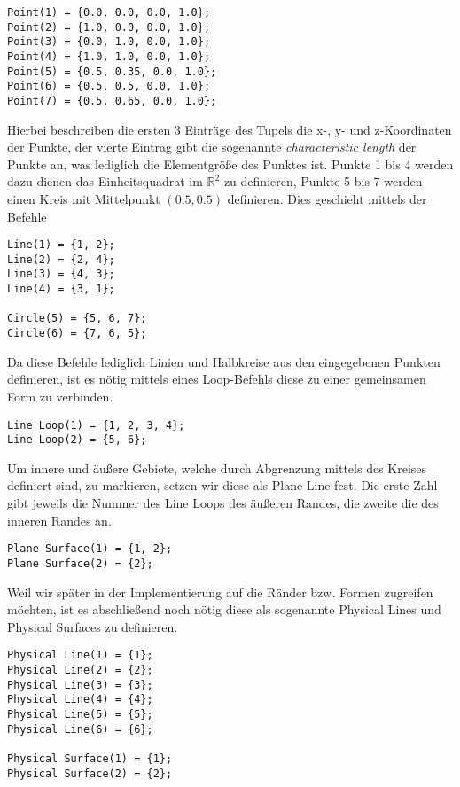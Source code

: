 \begin{lstlisting}
Point(1) = {0.0, 0.0, 0.0, 1.0};
Point(2) = {1.0, 0.0, 0.0, 1.0};
Point(3) = {0.0, 1.0, 0.0, 1.0};
Point(4) = {1.0, 1.0, 0.0, 1.0};
Point(5) = {0.5, 0.35, 0.0, 1.0};
Point(6) = {0.5, 0.5, 0.0, 1.0};
Point(7) = {0.5, 0.65, 0.0, 1.0};
\end{lstlisting}

Hierbei beschreiben die ersten 3 Einträge des Tupels die x-, y- und z-Koordinaten der Punkte, der vierte Eintrag gibt die sogenannte \textit{characteristic length} der Punkte an, was lediglich die Elementgröße des Punktes ist. Punkte 1 bis 4 werden dazu dienen das Einheitsquadrat im $\mathbb{R}^2$ zu definieren, Punkte 5 bis 7 werden einen Kreis mit Mittelpunkt $(0.5,0.5)$ definieren. Dies geschieht mittels der Befehle

\begin{lstlisting}
Line(1) = {1, 2};
Line(2) = {2, 4};
Line(3) = {4, 3};
Line(4) = {3, 1};

Circle(5) = {5, 6, 7};
Circle(6) = {7, 6, 5};
\end{lstlisting}

Da diese Befehle lediglich Linien und Halbkreise aus den eingegebenen Punkten definieren, ist es nötig mittels eines \textsf{Loop}-Befehls diese zu einer gemeinsamen Form zu verbinden.

\begin{lstlisting}
Line Loop(1) = {1, 2, 3, 4};
Line Loop(2) = {5, 6};
\end{lstlisting}

Um innere und äußere Gebiete, welche durch Abgrenzung mittels des Kreises definiert sind, zu markieren, setzen wir diese als \textsf{Plane Line} fest. Die erste Zahl gibt jeweils die Nummer des \textsf{Line Loops} des äußeren Randes, die zweite die des inneren Randes an.

\begin{lstlisting}
Plane Surface(1) = {1, 2};
Plane Surface(2) = {2};
\end{lstlisting}

Weil wir später in der Implementierung auf die Ränder bzw. Formen zugreifen möchten, ist es abschließend noch nötig diese als sogenannte \textsf{Physical Lines} und \textsf{Physical Surfaces} zu definieren. 

\begin{lstlisting}
Physical Line(1) = {1};
Physical Line(2) = {2};
Physical Line(3) = {3};
Physical Line(4) = {4};
Physical Line(5) = {5};
Physical Line(6) = {6};

Physical Surface(1) = {1};
Physical Surface(2) = {2};
\end{lstlisting}

